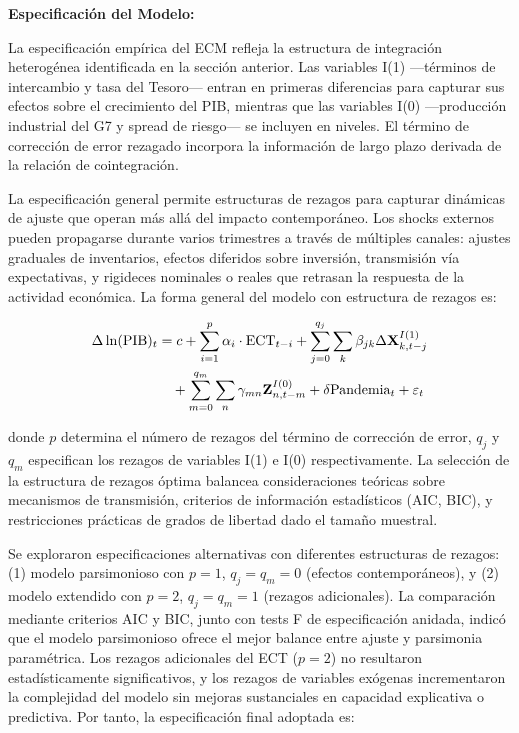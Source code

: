 \documentclass[3p,11pt]{elsarticle}
\begin{document}
\textbf{Especificación del Modelo:}

La especificación empírica del ECM refleja la estructura de integración heterogénea identificada en la sección anterior. Las variables I(1) ---términos de intercambio y tasa del Tesoro--- entran en primeras diferencias para capturar sus efectos sobre el crecimiento del PIB, mientras que las variables I(0) ---producción industrial del G7 y spread de riesgo--- se incluyen en niveles. El término de corrección de error rezagado incorpora la información de largo plazo derivada de la relación de cointegración. 

La especificación general permite estructuras de rezagos para capturar dinámicas de ajuste que operan más allá del impacto contemporáneo. Los shocks externos pueden propagarse durante varios trimestres a través de múltiples canales: ajustes graduales de inventarios, efectos diferidos sobre inversión, transmisión vía expectativas, y rigideces nominales o reales que retrasan la respuesta de la actividad económica. La forma general del modelo con estructura de rezagos es:

\begin{align}
\Delta \ln(\text{PIB})_{t} &= c + \sum_{i=1}^{p} \alpha_i \cdot \text{ECT}_{t-i} + \sum_{j=0}^{q_j} \sum_{k} \beta_{jk} \Delta \mathbf{X}_{k,t-j}^{I(1)} \notag \\
&\quad + \sum_{m=0}^{q_m} \sum_{n} \gamma_{mn} \mathbf{Z}_{n,t-m}^{I(0)} + \delta \text{Pandemia}_{t} + \varepsilon_{t}
\end{align}

donde $p$ determina el número de rezagos del término de corrección de error, $q_j$ y $q_m$ especifican los rezagos de variables I(1) e I(0) respectivamente. La selección de la estructura de rezagos óptima balancea consideraciones teóricas sobre mecanismos de transmisión, criterios de información estadísticos (AIC, BIC), y restricciones prácticas de grados de libertad dado el tamaño muestral.

Se exploraron especificaciones alternativas con diferentes estructuras de rezagos: (1) modelo parsimonioso con $p=1$, $q_j=q_m=0$ (efectos contemporáneos), y (2) modelo extendido con $p=2$, $q_j=q_m=1$ (rezagos adicionales). La comparación mediante criterios AIC y BIC, junto con tests F de especificación anidada, indicó que el modelo parsimonioso ofrece el mejor balance entre ajuste y parsimonia paramétrica. Los rezagos adicionales del ECT ($p=2$) no resultaron estadísticamente significativos, y los rezagos de variables exógenas incrementaron la complejidad del modelo sin mejoras sustanciales en capacidad explicativa o predictiva. Por tanto, la especificación final adoptada es:
\end{document}
